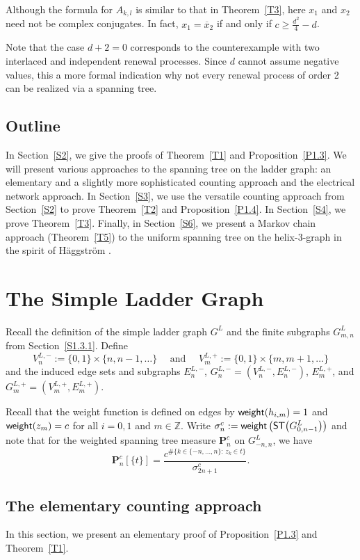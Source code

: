 \documentclass[11pt]{article}
\providecommand{\1}{\mathBB{1}}
\newcommand{\mbu}{\quad\mbox{ and }\quad}
\renewcommand{\P}{\mathbf{P}}
\newcommand{\Z}{{\mathbb{Z}}}
\def\SPT{\mathsf{ST}}
\newcommand{\Section}[1]{\section{#1}\setcounter{figure}{0}\setcounter{table}{0}\setcounter{equation}{0}}
\newcommand{\weight}{\mathop{\mbox{\sf weight}}}
\begin{document}
Although the formula for $A_{k,l}$ is similar to that in Theorem~\ref{T3}, here $x_1$ and $x_2$ need not be complex conjugates. In fact, $x_1=\overline x_2$ if and only if $c\geq \frac{d^2}{4}-d$.

Note that the case $d+2=0$ corresponds to the counterexample with two interlaced and independent renewal processes. Since $d$ cannot assume negative values, this a more formal indication why not every renewal process of order 2 can be realized via a spanning tree.
\subsection{Outline}
\label{S1.4}
In Section~\ref{S2}, we give the proofs of Theorem~\ref{T1} and Proposition~\ref{P1.3}. We will present various approaches to the spanning tree on the ladder graph: an elementary and a slightly more sophisticated counting approach and the electrical network approach. In Section~\ref{S3}, we use the versatile counting approach from Section~\ref{S2} to prove Theorem~\ref{T2} and Proposition~\ref{P1.4}. In Section~\ref{S4}, we prove Theorem~\ref{T3}. Finally,  in Section~\ref{S6}, we present a Markov chain approach (Theorem~\ref{T5}) to the uniform spanning tree on the helix-3-graph in the spirit of H\"{a}ggstr\"{o}m \cite{Haggstrom1994}.

\Section{The Simple Ladder Graph}
\label{S2}
Recall the definition of the simple ladder graph $G^L$ and the finite subgraphs $G^L_{m,n}$ from Section~\ref{S1.3.1}. Define
$$V^{L,-}_{n}:=\{0,1\}\times\{n,n-1,\ldots\}\mbu V^{L,+}_m:=\{0,1\}\times\{m,m+1,\ldots\}$$
and the induced edge sets and subgraphs $E^{L,-}_{n}$, $G^{L,-}_{n}=(V^{L,-}_{n},E^{L,-}_n)$, $E^{L,+}_{m}$, and $G^{L,+}_{m}=(V^{L,+}_{m},E^{L,+}_m)$.


Recall that the weight function is defined on edges by $\weight(h_{i,m})=1$ and $\weight(z_m)=c$ for all $i=0,1$ and $m\in\Z$. Write $\sigma^c_n:=\weight\big(\SPT\big(G^L_{0,n-1}\big)\big)$ and note that for the weighted spanning tree measure $\P^c_n$ on $G^L_{-n,n}$, we have
\begin{equation}
\label{E2.01}
\P^c_n[\{t\}]=\frac{\displaystyle c^{\#\{k\in\{-n,\ldots,n\}:\,z_k\in t\}}}{\sigma^c_{2n+1}}.
\end{equation}

\subsection{The elementary counting approach}
\label{S2.1}
In this section, we present an elementary proof of Proposition~\ref{P1.3} and Theorem~\ref{T1}.\medskip
\end{document}
